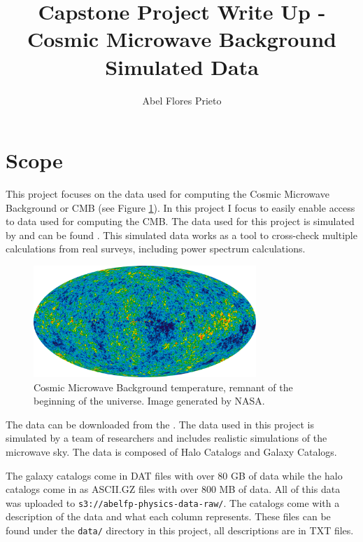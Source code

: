 \documentclass[12pt,letterpaper]{article}
\author{Abel Flores Prieto}
\title{Capstone Project Write Up - Cosmic Microwave Background Simulated Data}
\newcommand{\MYhref}[3][blue]{\href{#2}{\color{#1}{#3}}}%
\begin{document}
\maketitle

\section*{Scope}
This project focuses on the data used for computing the Cosmic Microwave
Background or CMB (see Figure \ref{fig:cmb}). In this project I focus to easily
enable access to data used for computing the CMB. The data used for this
project is simulated by \MYhref{https://arxiv.org/abs/0908.0540}{Sehgal et al.
(2010)} and can be found
\MYhref{https://lambda.gsfc.nasa.gov/simulation/tb\_sim\_ov.cfm\#2009}{here}.
This simulated data works as a tool to cross-check multiple calculations from
real surveys, including power spectrum calculations.

\begin{figure}[h!]
    \centering
    \includegraphics[width=0.75\textwidth]{imgs/cmb_temp.png}
    \caption{Cosmic Microwave Background temperature, remnant of the beginning
    of the universe. Image generated by NASA.}
    \label{fig:cmb}
\end{figure}

The data can be downloaded from the
\MYhref{https://lambda.gsfc.nasa.gov}{Legacy Archive for Microwave Background
Data Analysis}. The data used in this project is simulated by a team of
researchers and includes realistic simulations of the microwave sky. The data
is composed of Halo Catalogs and Galaxy Catalogs.

The galaxy catalogs come in DAT files with over 80 GB of data while the halo
catalogs come in as ASCII.GZ files with over 800 MB of data. All of this data
was uploaded to \texttt{s3://abelfp-physics-data-raw/}. The catalogs come with
a description of the data and what each column represents. These files can be
found under the \texttt{data/} directory in this project, all descriptions are
in TXT files.
\end{document}
